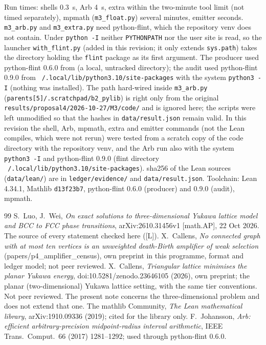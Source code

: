 \documentclass[11pt]{article}
\newcommand{\tier}[1]{\textsf{[#1]}}
\newcommand{\tL}{\tier{L}}
\begin{document}
Run times: shells 0.3~s, Arb 4~s, extra within the two-minute tool limit (not timed separately), mpmath (\texttt{m3\_float.py}) several minutes, emitter seconds. \texttt{m3\_arb.py} and \texttt{m3\_extra.py} need python-flint, which the repository venv does not contain. Under \texttt{python -I} neither \texttt{PYTHONPATH} nor the user site is read, so
the launcher \texttt{with\_flint.py} (added in this revision; it only extends \texttt{sys.path}) takes the directory holding the \texttt{flint} package as its first argument. The producer used python-flint 0.6.0 from 
(a local, untracked directory); the audit used python-flint 0.9.0 from \texttt{\string~/.local/lib/python3.10/site-packages} with the system \texttt{python3 -I} (nothing was installed). The path hard-wired inside \texttt{m3\_arb.py}
(\texttt{parents[5]/.scratchpad/b2\_pylib}) is right only from the original \texttt{results/proposal4/2026-10-27/M3/code/} and is ignored here; the scripts were left unmodified so that the hashes in \texttt{data/result.json} remain valid.
In this revision the shell, Arb, mpmath, extra and emitter commands (not the Lean compiles, which were not rerun) were tested from a scratch copy of the code directory with the repository venv, and the Arb run also with the system \texttt{python3 -I} and python-flint 0.9.0 (flint directory \texttt{\string~/.local/lib/python3.10/site-packages}).
sha256 of the Lean sources (\texttt{data/lean/}) are in \texttt{ledger/evidence/} and \texttt{data/result.json}. Toolchain: Lean 4.34.1, Mathlib \texttt{d13f23b7}, python-flint 0.6.0 (producer) and 0.9.0 (audit), mpmath.

\begin{thebibliography}{99}\small
{} S.~Luo, J.~Wei, \emph{On exact solutions to three-dimensional Yukawa lattice model and BCC to FCC phase transitions}, arXiv:2610.31456v1 [math.AP], 22 Oct 2026. The source of every statement checked here (\tL).
 X.~Callens, \emph{No connected graph with at most ten vertices is an unweighted death-Birth amplifier of weak selection} (papers/p4\_amplifier\_census), own preprint in this programme, format and ledger model; not peer reviewed.
 X.~Callens, \emph{Triangular lattice minimises the planar Yukawa energy}, doi:10.5281/zenodo.23646105 (2026), own preprint; the planar (two-dimensional) Yukawa lattice setting, with the same tier conventions. Not peer reviewed. The present note concerns the three-dimensional problem and does not extend that one.
 The mathlib Community, \emph{The Lean mathematical library}, arXiv:1910.09336 (2019); cited for the library only.
 F.~Johansson, \emph{Arb: efficient arbitrary-precision midpoint-radius interval arithmetic}, IEEE Trans.\ Comput.\ 66 (2017) 1281--1292; used through python-flint 0.6.0.
\end{thebibliography}
\end{document}
